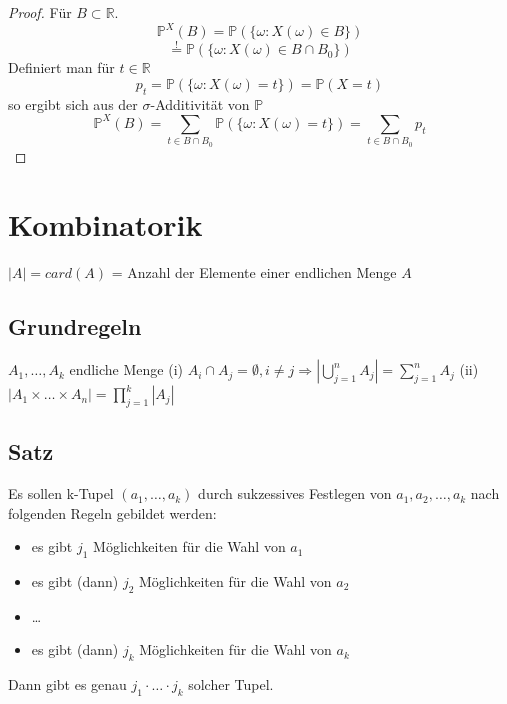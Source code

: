 \documentclass[a4paper,11pt,notitlepage]{report}
\newcommand{\R}{{\ensuremath{\mathbb{R}}}}
\newcommand{\Prim}{{\ensuremath{\mathbb{P}}}}
\begin{document}
\begin{proof}
Für $B \subset \R$.
\newline
$$\Prim^X(B) = \Prim(\{ \omega \colon X(\omega) \in B\})$$
$$\overset{!}{=} \Prim(\{\omega \colon X(\omega) \in B \cap B_0 \})$$
Definiert man für $t \in \R$
$$p_t = \Prim(\{\omega \colon X(\omega) = t\}) = \Prim(X = t)$$
so ergibt sich aus der $\sigma$-Additivität von $\Prim$
$$\Prim^X(B) = \sum\limits_{t \in B \cap B_0}{\Prim(\{\omega \colon X(\omega) = t \})} = \sum \limits_{t \in B \cap B_0}{p_t}$$
\end{proof}

\chapter{Kombinatorik}
$|A| = card(A)$ = Anzahl der Elemente einer endlichen Menge $A$

\section{Grundregeln}
$A_1, \ldots, A_k$ endliche Menge
\newline
(i) $A_i \cap A_j = \emptyset, i \neq j \Rightarrow \left|\bigcup\limits_{j=1}^{n}{A_j}\right| = \sum\limits_{j=1}^{n}{A_j}$
\newline
\label{grundregeln}
(ii) $|A_1 \times \ldots \times A_n| = \prod\limits_{j=1}^{k}{|A_j|}$

\section{Satz}
\label{urnen}
Es sollen k-Tupel $(a_1, \ldots, a_k)$ durch sukzessives Festlegen von $a_1,a_2,\ldots,a_k$ nach folgenden Regeln gebildet werden:
\begin{itemize}
	\item es gibt $j_1$ Möglichkeiten für die Wahl von $a_1$
	\item es gibt (dann) $j_2$ Möglichkeiten für die Wahl von $a_2$
	\item \ldots
	\item es gibt (dann) $j_k$ Möglichkeiten für die Wahl von $a_k$
\end{itemize}
Dann gibt es genau $j_1 \cdot \ldots \cdot j_k$ solcher Tupel.
\end{document}
